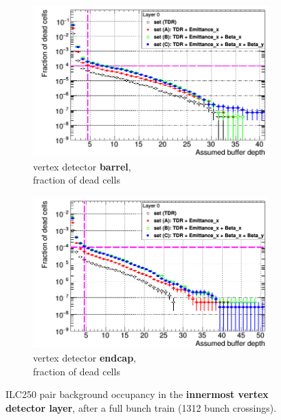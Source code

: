 \begin{figure}
    \begin{subfigure}[b]{0.49\textwidth}
   \centering
    \includegraphics[width=\textwidth]{Figures/Pairs/Occupancy_Comparison_Layer_0_deadcells_ILC250_ALL_SETS_SiVertexBarrel_corrected_Barrel_size.png}
   \caption{\sid vertex detector \textbf{barrel},\\fraction of dead cells}
   \end{subfigure}
   \hfill
    \begin{subfigure}[b]{0.49\textwidth}
   \centering
    \includegraphics[width=\textwidth]{Figures/Pairs/Occupancy_Comparison_Layer_0_deadcells_ILC250_ALL_SETS_5T_w_antiDiD_SiVertexEndcap.png}
   \caption{\sid vertex detector \textbf{endcap},\\fraction of dead cells}
   \end{subfigure}
   \caption[Pair background occupancy in the \sid vertex detector layer 0 for the ILC250]{ILC250 pair background occupancy in the \textbf{innermost \sid vertex detector layer}, after a full bunch train (\num{1312} bunch crossings).
}
\end{figure}
